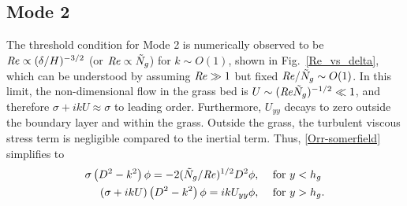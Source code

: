 \documentclass{jfm}
\newcommand{\hg}{h_g}
\newcommand{\Ndg}{\tilde{N}_g}
\begin{document}
\subsection{Mode 2}
The threshold condition for Mode 2 is numerically observed to be $\mbox{\textit{Re}} \propto ({\delta}/{H})^{-3/2}$ (or $\Rey \propto \Ndg$) for $k\sim O(1)$, shown in Fig.~\ref{Re_vs_delta}, which can be understood by assuming $\mbox{\textit{Re}} \gg 1$ but fixed $\Rey/\Ndg \sim O(1)$.
In this limit, the non-dimensional flow in the grass bed is $U\sim (\Rey \Ndg)^{-1/2} \ll 1$, and therefore $\sigma + ikU \approx \sigma$ to leading order. 
Furthermore, $U_{yy}$ decays to zero outside the boundary layer and within the grass. 
Outside the grass, the turbulent viscous stress term is negligible compared to the inertial term. Thus, \eqref{Orr-somerfield} simplifies to 
\begin{subequations}
\begin{align}
\sigma\left(D^2-k^2\right)\phi = -2{(\Ndg/\Rey)^{1/2}}D^2\phi,  \quad &\text{ for } y<\hg  \label{eqn:mode2asympa} \\
\left(\sigma+ikU\right) \left(D^2-k^2\right)\phi =  ikU_{yy}\phi, \quad &\text{ for } y>\hg. \label{eqn:mode2asympb}
\end{align}
\label{eqn:mode2asymp}
\end{subequations}
\end{document}
